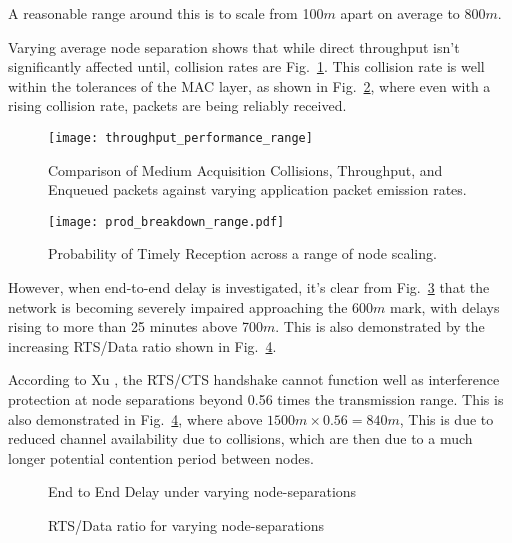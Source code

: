A reasonable range around this is to scale from 100$m$ apart on average to 800$m$.

Varying average node separation shows that while direct throughput isn't significantly affected until, collision rates are Fig.~\ref{fig:throughput_performance_range}.
This collision rate is well within the tolerances of the MAC layer, as shown in Fig.~\ref{fig:prod_breakdown_range}, where even with a rising collision rate, packets are being reliably received.

\begin{figure}[H]
	\centering
	\texttt{[image: throughput\_performance\_range]}
	\caption{Comparison of Medium Acquisition Collisions, Throughput, and Enqueued packets against varying application packet emission rates.}
	\label{fig:throughput_performance_range}
\end{figure}

\begin{figure}[H]
	\centering
	\texttt{[image: prod\_breakdown\_range.pdf]}
	\caption{Probability of Timely Reception across a range of node scaling.}
	\label{fig:prod_breakdown_range}
\end{figure}

However, when end-to-end delay is investigated, it's clear from Fig.~\ref{fig:delay_range} that the network is becoming severely impaired approaching the 600$m$ mark, with delays rising to more than 25 minutes above 700$m$.
This is also demonstrated by the increasing RTS/Data ratio shown in Fig.~\ref{fig:rts_range}.

According to Xu \cite{Xu2002}, the RTS/CTS handshake cannot function well as interference protection at node separations beyond 0.56 times the transmission range. 
This is also demonstrated in  Fig.~\ref{fig:rts_range}, where above $1500m \times 0.56 = 840m$, 
This is due to reduced channel availability due to collisions, which are then due to a much longer potential contention period between nodes. 

\begin{figure}[H]
	\centering
	\caption{End to End Delay under varying node-separations}
	\label{fig:delay_range}
\end{figure}

\begin{figure}[H]
	\centering
	\caption{RTS/Data ratio for varying node-separations}
	\label{fig:rts_range}
\end{figure}


